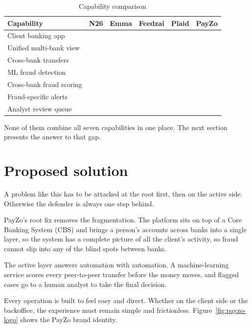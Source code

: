 \documentclass[12pt,a4paper]{report}
\newcommand{\yes}{\textcolor{pzgreen}{\ding{51}}}
\newcommand{\no}{\textcolor{pzred}{\ding{55}}}
\newcommand{\partialmark}{\textcolor{pzamber}{\LEFTcircle}}
\begin{document}
\begin{table}[H]
\centering
\begin{tabular}{|l|c|c|c|c|c|}
\hline
\textbf{Capability} & \textbf{N26} & \textbf{Emma} & \textbf{Feedzai} & \textbf{Plaid} & \textbf{PayZo} \\
\hline
Client banking app        & \yes & \yes & \no  & \no  & \yes \\
\hline
Unified multi-bank view   & \no  & \yes & \no  & \no  & \yes \\
\hline
Cross-bank transfers      & \yes & \yes & \no  & \no  & \yes \\
\hline
ML fraud detection        & \yes & \no  & \yes & \yes & \yes \\
\hline
Cross-bank fraud scoring  & \no  & \no  & \partialmark & \partialmark & \yes \\
\hline
Fraud-specific alerts     & \partialmark & \no  & \partialmark & \no  & \yes \\
\hline
Analyst review queue      & \yes & \no  & \yes & \partialmark & \yes \\
\hline
\end{tabular}
\caption{Capability comparison}
\label{tab:capability}
\end{table}

None of them combine all seven capabilities in one place. The next section presents the answer to that gap.

\section{Proposed solution}

A problem like this has to be attacked at the root first, then on the active side. Otherwise
the defender is always one step behind.

PayZo's root fix removes the fragmentation. The platform sits on top of a Core Banking
System (CBS) and brings a person's accounts across banks into a single layer, so the system
has a complete picture of all the client's activity, so fraud cannot slip into any of the blind
spots between banks.

The active layer answers automation with automation. A machine-learning service scores
every peer-to-peer transfer before the money moves, and flagged cases go to a human analyst
to take the final decision.

Every operation is built to feel easy and direct. Whether on the client side or the backoffice,
the experience must remain simple and frictionless. Figure~\ref{fig:payzo-logo} shows the
PayZo brand identity.
\end{document}
